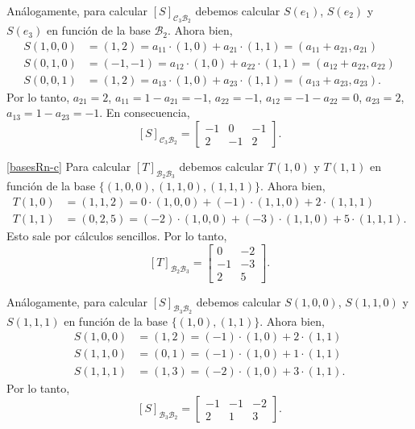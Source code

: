 \begin{enumerate}[topsep=6pt, itemsep=.4cm]
Análogamente, para calcular $[S]_{\mathcal{C}_3\mathcal{B}_2}$ debemos calcular $S(e_1)$, $S(e_2)$ y $S(e_3)$ en función de la base $\mathcal{B}_2$. Ahora bien,
\begin{align*}
    S(1,0,0) &= (1,2) = a_{11} \cdot (1,0) + a_{21} \cdot (1,1)=(a_{11} + a_{21}, a_{21}) \\
    S(0,1,0) &= (-1,-1) = a_{12} \cdot (1,0) + a_{22} \cdot (1,1)=(a_{12} + a_{22}, a_{22}) \\
    S(0,0,1) &= (1,2) = a_{13} \cdot (1,0) + a_{23} \cdot (1,1)=(a_{13} + a_{23}, a_{23}).
\end{align*}
Por lo tanto, $a_{21} = 2$, $a_{11} = 1 - a_{21} = -1$, $a_{22} = -1$, $a_{12} = -1 - a_{22} = 0$, $a_{23} = 2$, $a_{13} = 1 - a_{23} = -1$. En  consecuencia,
$$
[S]_{\mathcal{C}_3\mathcal{B}_2} = \begin{bmatrix}
    -1 & 0 & -1 \\ 2 & -1 & 2
\end{bmatrix}.
$$

\ref{basesRn-c} Para calcular $[T]_{\mathcal{B}_2\mathcal{B}_3}$ debemos calcular $T(1,0)$ y $T(1,1)$ en función de la base $\{(1,0,0), (1,1,0), (1,1,1)\}$. Ahora bien,
\begin{align*}
    T(1,0) &= (1,1,2) = 0 \cdot (1,0,0) + (-1) \cdot (1,1,0) + 2 \cdot (1,1,1) \\
    T(1,1) &= (0,2,5) = (-2) \cdot (1,0,0) + (-3) \cdot (1,1,0) + 5 \cdot (1,1,1).
\end{align*}
Esto sale por cálculos sencillos. Por lo tanto, 
$$
[T]_{\mathcal{B}_2\mathcal{B}_3} = \begin{bmatrix}
    0 & -2 \\ -1 & -3 \\ 2 & 5
\end{bmatrix}.
$$

Análogamente, para calcular $[S]_{\mathcal{B}_3\mathcal{B}_2}$ debemos calcular $S(1,0,0)$, $S(1,1,0)$ y $S(1,1,1)$ en función de la base $\{(1,0), (1,1)\}$. Ahora bien,
\begin{align*}
    S(1,0,0) &= (1,2) = (-1) \cdot (1,0) + 2 \cdot (1,1) \\
    S(1,1,0) &= (0,1) = (-1) \cdot (1,0) + 1 \cdot (1,1) \\
    S(1,1,1) &= (1,3) = (-2) \cdot (1,0) + 3 \cdot (1,1).
\end{align*}
Por lo tanto,
$$
[S]_{\mathcal{B}_3\mathcal{B}_2} = \begin{bmatrix}
    -1 & -1 & -2 \\ 2 & 1 & 3
\end{bmatrix}.
$$


\end{enumerate}
